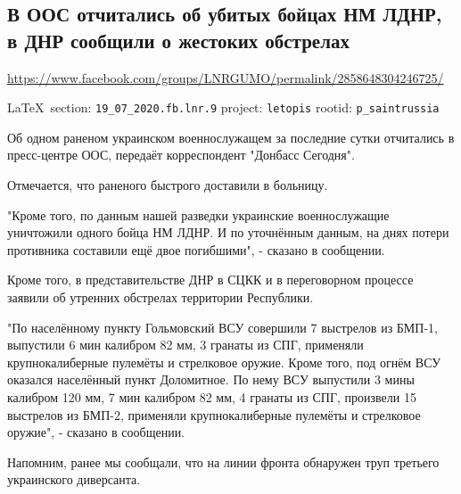  
 

\subsection{В ООС отчитались об убитых бойцах НМ ЛДНР, в ДНР сообщили о жестоких обстрелах}
\url{https://www.facebook.com/groups/LNRGUMO/permalink/2858648304246725/}
  
\vspace{0.5cm}
{\small\LaTeX~section: \verb|19_07_2020.fb.lnr.9| project: \verb|letopis| rootid: \verb|p_saintrussia|}
\vspace{0.5cm}

Об одном раненом украинском военнослужащем за последние сутки отчитались в
пресс-центре ООС, передаёт корреспондент "Донбасс Сегодня".

Отмечается, что раненого быстрого доставили в больницу.

"Кроме того, по данным нашей разведки украинские военнослужащие уничтожили
одного бойца НМ ЛДНР. И по уточнённым данным, на днях потери противника
составили ещё двое погибшими", - сказано в сообщении.

Кроме того, в представительстве ДНР в СЦКК и в переговорном процессе заявили об
утренних обстрелах территории Республики.

"По населённому пункту Гольмовский ВСУ совершили 7 выстрелов из БМП-1,
выпустили 6 мин калибром 82 мм, 3 гранаты из СПГ, применяли крупнокалиберные
пулемёты и стрелковое оружие. Кроме того, под огнём ВСУ оказался населённый
пункт Доломитное. По нему ВСУ выпустили 3 мины калибром 120 мм, 7 мин калибром
82 мм, 4 гранаты из СПГ, произвели 15 выстрелов из БМП-2, применяли
крупнокалиберные пулемёты и стрелковое оружие", - сказано в сообщении.

Напомним, ранее мы сообщали, что на линии фронта обнаружен труп третьего
украинского диверсанта. 
